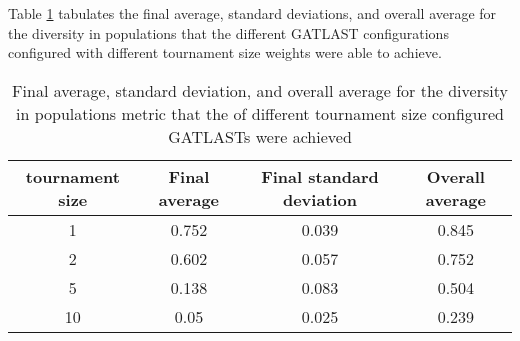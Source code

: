 Table \ref{tab:HP:GA:tournamentSize:diversity in populations} tabulates the final average, standard deviations, and overall average for the diversity in populations that the different GATLAST configurations configured with different tournament size weights were able to achieve.
\begin{table}[tbh!]
\centering
\begin{adjustbox}{trim=0cm 0cm 0cm 0cm, clip=true}
\begin{tabular}{|c|c|c|c|}
\hline
tournament size & Final average & Final standard deviation & Overall average\\
\hline
1 & 0.752 & 0.039 & 0.845\\\hline
2 & 0.602 & 0.057 & 0.752\\\hline
5 & 0.138 & 0.083 & 0.504\\\hline
10 & 0.05 & 0.025 & 0.239\\\hline
\end{tabular}
\end{adjustbox}
\caption{Final average, standard deviation, and overall average for the diversity in populations metric that the of different tournament size configured GATLASTs were achieved}
\label{tab:HP:GA:tournamentSize:diversity in populations}
\end{table}